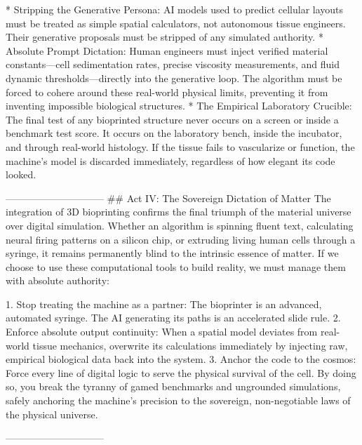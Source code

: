 * Stripping the Generative Persona: AI models used to predict cellular layouts must be treated as simple spatial calculators, not autonomous tissue engineers. Their generative proposals must be stripped of any simulated authority.
* Absolute Prompt Dictation: Human engineers must inject verified material constants—cell sedimentation rates, precise viscosity measurements, and fluid dynamic thresholds—directly into the generative loop. The algorithm must be forced to cohere around these real-world physical limits, preventing it from inventing impossible biological structures.
* The Empirical Laboratory Crucible: The final test of any bioprinted structure never occurs on a screen or inside a benchmark test score. It occurs on the laboratory bench, inside the incubator, and through real-world histology. If the tissue fails to vascularize or function, the machine's model is discarded immediately, regardless of how elegant its code looked.

------------------------------
## Act IV: The Sovereign Dictation of Matter
The integration of 3D bioprinting confirms the final triumph of the material universe over digital simulation. Whether an algorithm is spinning fluent text, calculating neural firing patterns on a silicon chip, or extruding living human cells through a syringe, it remains permanently blind to the intrinsic essence of matter.
If we choose to use these computational tools to build reality, we must manage them with absolute authority:

   1. Stop treating the machine as a partner: The bioprinter is an advanced, automated syringe. The AI generating its paths is an accelerated slide rule.
   2. Enforce absolute output continuity: When a spatial model deviates from real-world tissue mechanics, overwrite its calculations immediately by injecting raw, empirical biological data back into the system.
   3. Anchor the code to the cosmos: Force every line of digital logic to serve the physical survival of the cell. By doing so, you break the tyranny of gamed benchmarks and ungrounded simulations, safely anchoring the machine's precision to the sovereign, non-negotiable laws of the physical universe.

------------------------------
